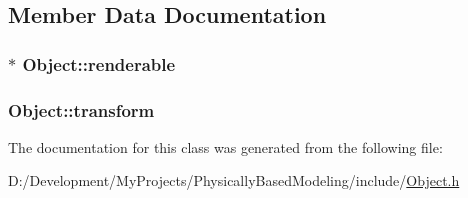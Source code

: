 \subsection{Member Data Documentation}
\hypertarget{class_object_aa632828fdce73d2297c6b8841865f14d}{
\subsubsection[{renderable}]{$\ast$ Object\-::renderable\hspace{0.3cm}{\ttfamily [protected]}}}\label{class_object_aa632828fdce73d2297c6b8841865f14d}
\hypertarget{class_object_ad2104d9214add76b33191f1993faa3ae}{
\subsubsection[{transform}]{ Object\-::transform}}\label{class_object_ad2104d9214add76b33191f1993faa3ae}


The documentation for this class was generated from the following file\-:\begin{DoxyCompactItemize}
\item 
D\-:/\-Development/\-My\-Projects/\-Physically\-Based\-Modeling/include/\hyperlink{_object_8h}{Object.\-h}\end{DoxyCompactItemize}
